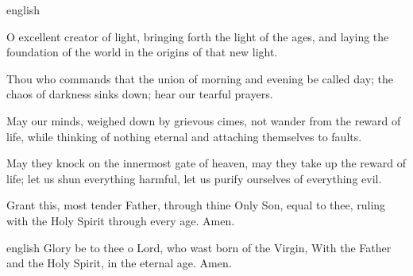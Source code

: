 {english}
{O excellent creator of light,
bringing forth the light of the ages,
and laying the foundation of the world
in the origins of that new light.

Thou who commands that the union
of morning and evening be called day;
the chaos of darkness sinks down;
hear our tearful prayers.

May our minds, weighed down by grievous cimes,
not wander from the reward of life,
while thinking of nothing eternal
and attaching themselves to faults.

May they knock on the innermost gate of heaven,
may they take up the reward of life;
let us shun everything harmful,
let us purify ourselves of everything evil.

Grant this, most tender Father,
through thine Only Son, equal to thee,
ruling with the Holy Spirit
through every age. Amen.}


{english}
{Glory be to thee o Lord, who wast born of the Virgin, With the Father and the Holy Spirit, in the eternal age. Amen.}
